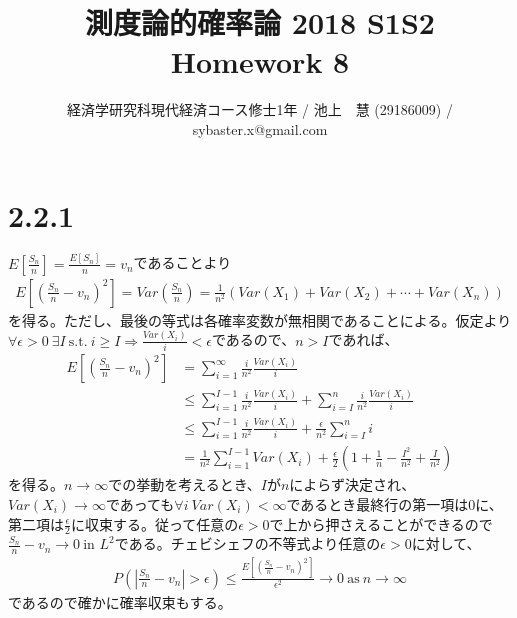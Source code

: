 \documentclass{article}
\begin{document}
\title{測度論的確率論 2018 S1S2 \\ 
Homework 8}
\author{経済学研究科現代経済コース修士1年 / 池上　慧 (29186009) / sybaster.x@gmail.com}
\maketitle

\section{2.2.1}
$E\left[ \frac{S_n}{n} \right] = \frac{E[S_n]}{n} = v_n$であることより
\begin{align*}
	E\left[ \left( \frac{S_n}{n} - v_n \right)^2 \right] = Var\left(\frac{S_n}{n}\right) = \frac{1}{n^2} \left( Var(X_1) + Var(X_2) + \cdots + Var(X_n) \right)
\end{align*}
を得る。ただし、最後の等式は各確率変数が無相関であることによる。仮定より$\forall \epsilon > 0\ \exists I \ \text{s.t.}\ i \geq I \Rightarrow  \frac{Var(X_i)}{i} < \epsilon$であるので、$n > I$であれば、
\begin{align*}
	E\left[ \left( \frac{S_n}{n} - v_n \right)^2 \right] &= \sum_{i=1}^{\infty} \frac{i}{n^2} \frac{Var(X_i)}{i}\\
	&\leq \sum_{i=1}^{I-1}  \frac{i}{n^2} \frac{Var(X_i)}{i} + \sum_{i=I}^{n}  \frac{i}{n^2} \frac{Var(X_i)}{i}\\
	&\leq  \sum_{i=1}^{I-1}  \frac{i}{n^2} \frac{Var(X_i)}{i} +  \frac{\epsilon}{n^2} \sum_{i=I}^n i \\
	&=\frac{1}{n^2} \sum_{i=1}^{I-1} Var(X_i) + \frac{\epsilon}{2}\left( 1 + \frac{1}{n} - \frac{I^2}{n^2} +\frac{I}{n^2} \right)
\end{align*}
を得る。$n\to \infty$での挙動を考えるとき、$I$が$n$によらず決定され、$Var(X_i) \to \infty$であっても$\forall i\ Var(X_i) < \infty$であるとき最終行の第一項は$0$に、第二項は$\frac{\epsilon}{2}$に収束する。従って任意の$\epsilon > 0$で上から押さえることができるので$\frac{S_n}{n} - v_n \to 0\ \text{in $L^2$}$である。チェビシェフの不等式より任意の$\epsilon > 0$に対して、
\begin{align*}
	P\left( \left| \frac{S_n}{n} - v_n \right| > \epsilon \right) \leq \frac{E\left[ \left( \frac{S_n}{n} - v_n \right)^2 \right]}{\epsilon^2} \to 0\ \text{as}\ n\to \infty
\end{align*}
であるので確かに確率収束もする。
\end{document}
